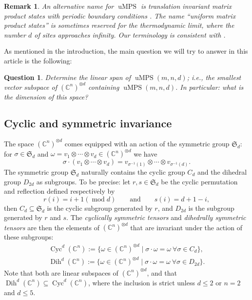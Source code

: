 \documentclass[pdftex]{sigma}
\numberwithin{equation}{section}
\newtheorem{Question}[Theorem]{Question}
\newtheorem{Remark}[Theorem]{Remark}
\newcommand{\CC}{\mathbb{C}}
\newcommand{\ot}{\otimes}
\newcommand{\SG}{\mathfrak{S}}
\DeclareMathOperator{\uMPS}{uMPS}
\DeclareMathOperator{\Cyc}{Cyc}
\DeclareMathOperator{\Dih}{Dih}
\begin{document}
\begin{Remark}
An alternative name for $\uMPS$ is \emph{translation invariant matrix product states with periodic boundary conditions} \cite{Critch2014AlgebraicGO, PerezGarciaVerstraeteMPS}. The name ``uniform matrix product states'' is sometimes reserved for the thermodynamic limit, where the number $d$ of sites approaches infinity. Our terminology is consistent with \cite{Czaplinski2019UniformMP, haegeman2014geometry}.
\end{Remark}

As mentioned in the introduction, the main question we will try to answer in this article is the following:
\begin{Question} \label{question:main}
Determine the linear span of $\uMPS(m,n,d)$; i.e., the smallest vector subspace of $(\CC^n)^{\ot d}$ containing $\uMPS(m,n,d)$. In particular: what is the dimension of this space?
\end{Question}

\subsection{Cyclic and symmetric invariance}
The space $(\CC^n)^{\ot d}$ comes equipped with an action of the symmetric group $\SG_d$: for $\sigma \in \SG_d$ and $\omega = v_1 \ot \cdots \ot v_d \in (\CC^n)^{\ot d}$ we have
\[
\sigma \cdot (v_1 \ot \cdots \ot v_d) = v_{\sigma^{-1}(1)} \ot \cdots \ot v_{\sigma^{-1}(d)}.
\]
The symmetric group $\SG_d$ naturally contains the cyclic group $C_d$ and the dihedral group $D_{2d}$ as subgroups. To be precise: let $r,s \in \SG_d$ be the cyclic permutation and reflection defined respectively by
\[
r(i) = i+1 (\operatorname{mod} d) \qquad \text{and} \qquad s(i) = d+1-i,
\]
then $C_d \subseteq \SG_d$ is the cyclic subgroup generated by $r$, and $D_{2d}$ is the subgroup generated by $r$ and $s$.
The \emph{cyclically symmetric tensors} and \emph{dihedrally symmetric tensors} are then the elements of $(\CC^n)^{\ot d}$ that are invariant under the action of these subgroups:
    \begin{gather*}
        \Cyc^d({\mathbb C}^n) := \big\{ \omega \in ({\mathbb C}^n)^{\ot d} \mid \sigma \cdot \omega = \omega \ \forall \sigma \in C_d\big\},\\
        \Dih^d({\mathbb C}^n) := \big\{ \omega \in ({\mathbb C}^n)^{\ot d} \mid \sigma \cdot \omega = \omega \  \forall \sigma \in D_{2d}\big\}.
    \end{gather*}
Note that both are linear subspaces of $(\CC^n)^{\ot d}$, and that $\Dih^d({\mathbb C}^n) \subseteq \Cyc^d({\mathbb C}^n)$, where the inclusion is strict unless $d \leq 2$ or $n=2$ and $d \leq 5$.
\end{document}
